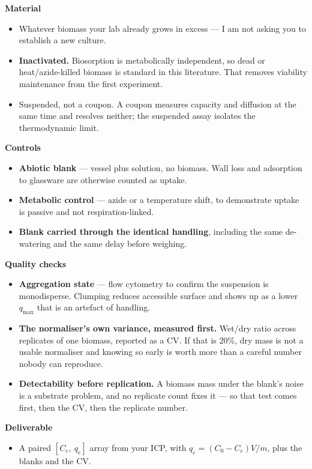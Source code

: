 \documentclass[landscape,12pt]{article}
\begin{document}
\vspace{1mm}
\begin{minipage}[t]{0.485\linewidth}
{\large\bfseries\color{bench} Material}
\begin{itemize}
  \item Whatever biomass your lab already grows in excess --- I am not asking you to
        establish a new culture.
  \item \textbf{Inactivated.} Biosorption is metabolically independent, so dead or
        heat/azide-killed biomass is standard in this literature. That removes viability
        maintenance from the first experiment.
  \item Suspended, not a coupon. A coupon measures capacity and diffusion at the same time
        and resolves neither; the suspended assay isolates the thermodynamic limit.
\end{itemize}

\vspace{2mm}
{\large\bfseries\color{bench} Controls}
\begin{itemize}
  \item \textbf{Abiotic blank} --- vessel plus solution, no biomass. Wall loss and
        adsorption to glassware are otherwise counted as uptake.
  \item \textbf{Metabolic control} --- azide or a temperature shift, to demonstrate uptake
        is passive and not respiration-linked.
  \item \textbf{Blank carried through the identical handling}, including the same
        de-watering and the same delay before weighing.
\end{itemize}
\end{minipage}\hfill
\begin{minipage}[t]{0.485\linewidth}
{\large\bfseries\color{bench} Quality checks}
\begin{itemize}
  \item \textbf{Aggregation state} --- flow cytometry to confirm the suspension is
        monodisperse. Clumping reduces accessible surface and shows up as a lower
        $q_{\max}$ that is an artefact of handling.
  \item \textbf{The normaliser's own variance, measured first.} Wet/dry ratio across
        replicates of one biomass, reported as a CV. If that is 20\%, dry mass is not a
        usable normaliser and knowing so early is worth more than a careful number nobody
        can reproduce.
  \item \textbf{Detectability before replication.} A biomass mass under the blank's noise is
        a substrate problem, and no replicate count fixes it --- so that test comes first,
        then the CV, then the replicate number.
\end{itemize}

\vspace{2mm}
{\large\bfseries\color{bench} Deliverable}
\begin{itemize}
  \item A paired $[C_e,\ q_e]$ array from your ICP, with
        $q_e = (C_0 - C_e)V/m$, plus the blanks and the CV.
\end{itemize}
\end{minipage}
\end{document}
